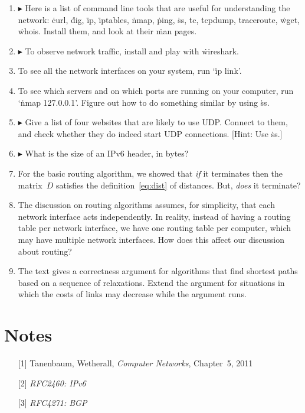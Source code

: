 \begin{enumerate}
\item
  $\blacktriangleright$
  Here is a list of command line tools that are useful for understanding the network:
  \.{curl},
  \.{dig},
  \.{ip},
  \.{iptables},
  \.{nmap},
  \.{ping},
  \.{ss},
  \.{tc},
  \.{tcpdump},
  \.{traceroute},
  \.{wget},
  \.{whois}.
  Install them, and look at their \.{man} pages.
\item
  $\blacktriangleright$
  To observe network traffic, install and play with \.{wireshark}.
\item
  To see all the network interfaces on your system,
    run `\.{ip link}'.
\item
  To see which servers and on which ports are running on your computer,
    run `\.{nmap 127.0.0.1}'.
  Figure out how to do something similar by using \.{ss}.
\item
  $\blacktriangleright$
  Give a list of four websites that are likely to use UDP\null.
  Connect to them, and check whether they do indeed start UDP connections.
  [Hint: Use \.{ss}.]
\item
  $\blacktriangleright$
  What is the size of an IPv6 header, in bytes?
\item
  For the basic routing algorithm,
    we showed that
      \emph{if} it terminates
      then the matrix~$D$ satisfies the definition~\eqref{eq:dist} of distances.
  But, \emph{does} it terminate?
\item
  The discussion on routing algorithms assumes, for simplicity,
    that each network interface acts independently.
  In reality,
    instead of having a routing table per network interface,
    we have one routing table per computer,
    which may have multiple network interfaces.
  How does this affect our discussion about routing?
\item
  The text gives a correctness argument for algorithms that find shortest paths
    based on a sequence of relaxations.
  Extend the argument for situations in which the costs of links may decrease
    while the argument runs.
\end{enumerate}

\section{Notes}

\begin{itemize}
\item[{[1]}]
  Tanenbaum, Wetherall,
  \emph{Computer Networks}, Chapter~5,
  2011
\item[{[2]}]
  \emph{RFC2460: IPv6}
\item[{[3]}]
  \emph{RFC4271: BGP}
\end{itemize}


